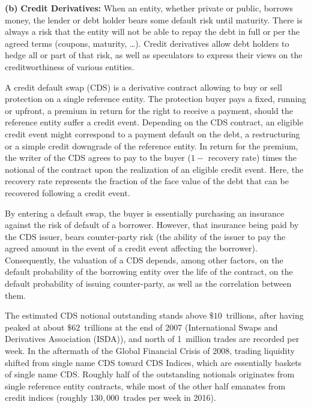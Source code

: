 \noindent\textbf{(b)} \textbf{Credit Derivatives:} When an entity, whether private or public, borrows money, the lender or debt holder bears some default risk until maturity. There is always a risk that the entity will not be able to repay the debt in full or per the agreed terms (coupons, maturity, \dots). Credit derivatives allow debt holders to hedge all or part of that risk, as well as speculators to express their views on the creditworthiness of various entities. 


A credit default swap (CDS) is a derivative contract allowing to buy or sell protection on a single reference entity. The protection buyer pays a fixed, running or upfront, a premium in return for the right to receive a payment, should the reference entity suffer a credit event. Depending on the CDS contract, an eligible credit event might correspond to a payment default on the debt, a restructuring or a simple credit downgrade of the reference entity. In return for the premium, the writer of the CDS agrees to pay to the buyer ($1 - \text{ recovery rate}$) times the notional of the contract upon the realization of an eligible credit event. Here, the recovery rate represents the fraction of the face value of the debt that can be recovered following a credit event.


By entering a default swap, the buyer is essentially purchasing an insurance against the risk of default of a borrower. However, that insurance being paid by the CDS issuer, bears counter-party risk (the ability of the issuer to pay the agreed amount in the event of a credit event affecting the borrower). Consequently, the valuation of a CDS depends, among other factors, on the default probability of the borrowing entity over the life of the contract, on the default probability of issuing counter-party, as well as the correlation between them.


The estimated CDS notional outstanding stands above $\$10$~trillions, after having peaked at about $\$62$~trillions at the end of 2007 (International Swaps and Derivatives Association (ISDA)), and north of 1~million trades are recorded per week. In the aftermath of the Global Financial Crisis of 2008, trading liquidity shifted from single name CDS toward CDS Indices, which are essentially baskets of single name CDS. Roughly half of the outstanding notionals originates from single reference entity contracts, while most of the other half emanates from credit indices (roughly $130,000$~trades per week in 2016).


